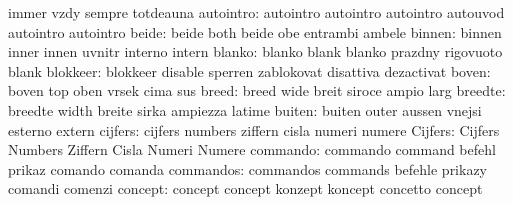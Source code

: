                            immer                     vzdy
                           sempre                    totdeauna
                autointro: autointro                 autointro
                           autointro                 autouvod
                           autointro                 autointro
                    beide: beide                     both
                           beide                     obe
                           entrambi                  ambele
                   binnen: binnen                    inner
                           innen                     uvnitr
                           interno                   intern
                   blanko: blanko                    blank
                           blanko                    prazdny
                           rigovuoto                 blank
                 blokkeer: blokkeer                  disable
                           sperren                   zablokovat
                           disattiva                 dezactivat
                    boven: boven                     top
                           oben                      vrsek
                           cima                      sus
                    breed: breed                     wide
                           breit                     siroce
                           ampio                     larg
                  breedte: breedte                   width
                           breite                    sirka
                           ampiezza                  latime
                   buiten: buiten                    outer
                           aussen                    vnejsi
                           esterno                   extern
                  cijfers: cijfers                   numbers
                           ziffern                   cisla
                           numeri                    numere
                  Cijfers: Cijfers                   Numbers
                           Ziffern                   Cisla
                           Numeri                    Numere
                 commando: commando                  command
                           befehl                    prikaz
                           comando                   comanda
                commandos: commandos                 commands
                           befehle                   prikazy
                           comandi                   comenzi
                  concept: concept                   concept
                           konzept                   koncept
                           concetto                  concept

